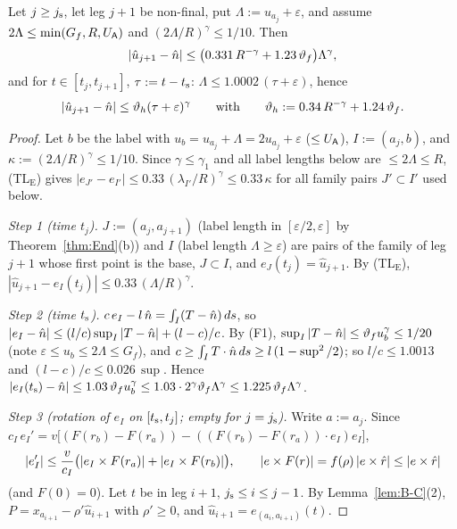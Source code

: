 \begin{lemma}\label{lem:T2-H}
Let $j\ge j_{\mathrm s}$, let leg $j+1$ be non-final, put $\Lambda:=u_{a_j}+\varepsilon$, and assume $2\Lambda\le\min(G_f,R,U_{\mathsf A})$ and
$(2\Lambda/R)^\gamma\le1/10$. Then
\[
|\hat u_{j+1}-\hat n|\le\bigl(0.331\,R^{-\gamma}+1.23\,\vartheta_f\bigr)\Lambda^\gamma ,
\]
and for $t\in[t_j,t_{j+1}]$, $\tau:=t-t_{\mathrm s}$: $\Lambda\le1.0002\,(\tau+\varepsilon)$, hence
\[
|\hat u_{j+1}-\hat n|\le\vartheta_h(\tau+\varepsilon)^\gamma\qquad\text{with}\qquad\vartheta_h:=0.34\,R^{-\gamma}+1.24\,\vartheta_f .
\]
\end{lemma}
\begin{proof}
Let $b$ be the label with $u_b=u_{a_j}+\Lambda=2u_{a_j}+\varepsilon$ ($\le U_{\mathsf A}$), $I:=(a_j,b)$, and
$\kappa:=(2\Lambda/R)^\gamma\le1/10$. Since $\gamma\le\gamma_1$ and all label lengths below are $\le2\Lambda\le R$, (TL$_{\mathrm E}$) gives
$|e_{J'}-e_{I'}|\le0.33\,(\lambda_{I'}/R)^\gamma\le0.33\,\kappa$ for all family pairs $J'\subset I'$ used below.

\emph{Step 1 (time $t_j$).} $J:=(a_j,a_{j+1})$ (label length in $[\varepsilon/2,\varepsilon]$ by Theorem~\ref{thm:End}(b)) and
$I$ (label length $\Lambda\ge\varepsilon$) are pairs of the family of leg $j+1$ whose first point is the base, $J\subset I$, and
$e_J(t_j)=\hat u_{j+1}$. By (TL$_{\mathrm E}$), $|\hat u_{j+1}-e_I(t_j)|\le0.33\,(\Lambda/R)^\gamma$.

\emph{Step 2 (time $t_{\mathrm s}$).} $c\,e_I-l\,\hat n=\int_I(T-\hat n)\,ds$, so
$|e_I-\hat n|\le(l/c)\sup_I|T-\hat n|+(l-c)/c$. By (F1), $\sup_I|T-\hat n|\le\vartheta_fu_b^\gamma\le1/20$ (note
$\varepsilon\le u_b\le2\Lambda\le G_f$), and $c\ge\int_IT\cdot\hat n\,ds\ge l\,(1-\sup^2/2)$; so $l/c\le1.0013$ and
$(l-c)/c\le0.026\,\sup$. Hence
$|e_I(t_{\mathrm s})-\hat n|\le1.03\,\vartheta_fu_b^\gamma\le1.03\cdot2^\gamma\vartheta_f\Lambda^\gamma\le1.225\,\vartheta_f\Lambda^\gamma$.

\emph{Step 3 (rotation of $e_I$ on $[t_{\mathrm s},t_j]$; empty for $j=j_{\mathrm s}$).} Write $a:=a_j$. Since
$c_I\,e_I'=v\bigl[(F(r_b)-F(r_a))-((F(r_b)-F(r_a))\cdot e_I)e_I\bigr]$,
\[
|e_I'|\le\frac v{c_I}\bigl(|e_I\times F(r_a)|+|e_I\times F(r_b)|\bigr),\qquad|e\times F(r)|=f(\rho)\,|e\times\hat r|\le|e\times\hat r|
\]
(and $F(0)=0$). Let $t$ be in leg $i+1$, $j_{\mathrm s}\le i\le j-1$. By Lemma~\ref{lem:B-C}(2), $P=x_{a_{i+1}}-\rho'\hat u_{i+1}$ with
$\rho'\ge0$, and $\hat u_{i+1}=e_{(a_i,a_{i+1})}(t)$.


\end{proof}
